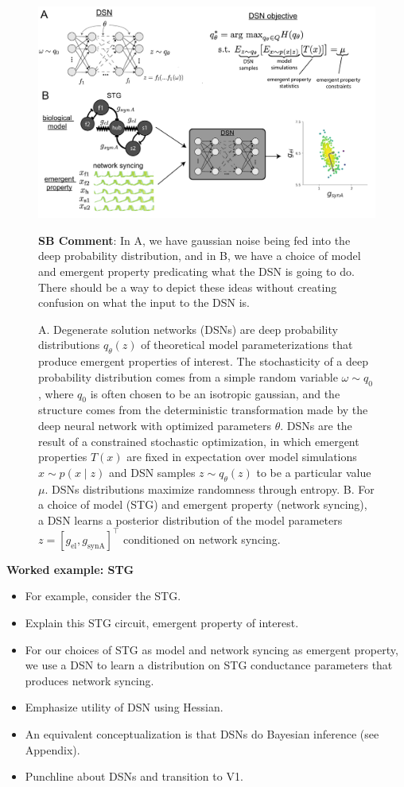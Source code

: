 \documentclass[11pt]{article}
\begin{document}
\begin{figure}
\begin{center}
\includegraphics[scale=0.4]{figs/fig2/fig2.pdf}
\end{center}
\caption{A. Degenerate solution networks (DSNs) are deep probability distributions $q_\theta(z)$ of theoretical model parameterizations that produce emergent properties of interest.  The stochasticity of a deep probability distribution comes from a simple random variable $\omega \sim q_0$, where $q_0$ is often chosen to be an isotropic gaussian, and the structure comes from the deterministic transformation made by the deep neural network with optimized parameters $\theta$.  DSNs are the result of a constrained stochastic optimization, in which emergent properties $T(x)$ are fixed in expectation over model simulations $x \sim p(x \mid z)$ and DSN samples $z \sim q_\theta(z)$ to be a particular value $\mu$.  DSNs distributions maximize randomness through entropy. B. For a choice of model (STG) and emergent property (network syncing), a DSN learns a posterior distribution of the model parameters  $z = \left[g_{\text{el}}, g_{\text{synA}} \right]^\top$ conditioned on network syncing.}
\textbf{SB Comment}: In A, we have gaussian noise being fed into the deep probability distribution, and in B, we have a choice of model and emergent property predicating what the DSN is going to do.  There should be a way to depict these ideas without creating confusion on what the input to the DSN is.
\end{figure}

\textbf{Worked example: STG}
\begin{itemize}
\item For example, consider the STG.
\item Explain this STG circuit, emergent property of interest.
\item  For our choices of STG as model and network syncing as emergent property, we use a DSN to learn a distribution on STG conductance parameters that produces network syncing.  
\item Emphasize utility of DSN using Hessian.
\item An equivalent conceptualization is that DSNs do Bayesian inference (see Appendix).
\item Punchline about DSNs and transition to V1.
\end{itemize}
\end{document}
